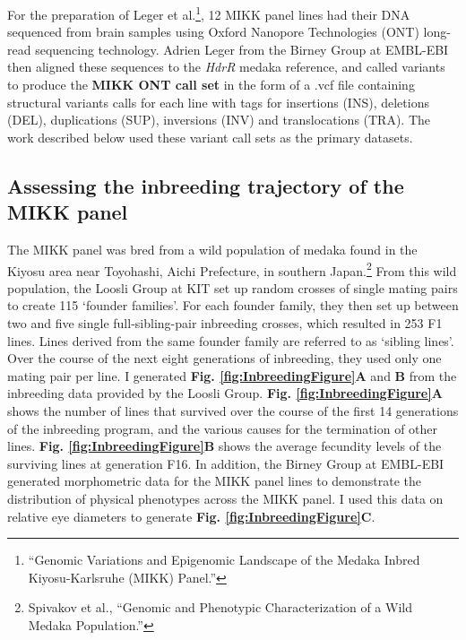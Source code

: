 \documentclass[
]{book}
\begin{document}
For the preparation of Leger et al.\footnote{{``Genomic Variations and Epigenomic Landscape of the {Medaka Inbred Kiyosu-Karlsruhe} ({MIKK}) Panel.''}}, 12 MIKK panel lines had their DNA sequenced from brain samples using Oxford Nanopore Technologies (ONT) long-read sequencing technology. Adrien Leger from the Birney Group at EMBL-EBI then aligned these sequences to the \emph{HdrR} medaka reference, and called variants to produce the \textbf{MIKK ONT call set} in the form of a .vcf file containing structural variants calls for each line with tags for insertions (INS), deletions (DEL), duplications (SUP), inversions (INV) and translocations (TRA). The work described below used these variant call sets as the primary datasets.

\hypertarget{inbreeding-sec}{%
\subsection{Assessing the inbreeding trajectory of the MIKK panel}\label{inbreeding-sec}}

The MIKK panel was bred from a wild population of medaka found in the Kiyosu area near Toyohashi, Aichi Prefecture, in southern Japan.\footnote{Spivakov et al., {``Genomic and {Phenotypic Characterization} of a {Wild Medaka Population}.''}} From this wild population, the Loosli Group at KIT set up random crosses of single mating pairs to create 115 `founder families'. For each founder family, they then set up between two and five single full-sibling-pair inbreeding crosses, which resulted in 253 F1 lines. Lines derived from the same founder family are referred to as `sibling lines'. Over the course of the next eight generations of inbreeding, they used only one mating pair per line. I generated \textbf{Fig. \ref{fig:InbreedingFigure}A} and \textbf{B} from the inbreeding data provided by the Loosli Group. \textbf{Fig. \ref{fig:InbreedingFigure}A} shows the number of lines that survived over the course of the first 14 generations of the inbreeding program, and the various causes for the termination of other lines. \textbf{Fig. \ref{fig:InbreedingFigure}B} shows the average fecundity levels of the surviving lines at generation F16. In addition, the Birney Group at EMBL-EBI generated morphometric data for the MIKK panel lines to demonstrate the distribution of physical phenotypes across the MIKK panel. I used this data on relative eye diameters to generate \textbf{Fig. \ref{fig:InbreedingFigure}C}.
\end{document}
